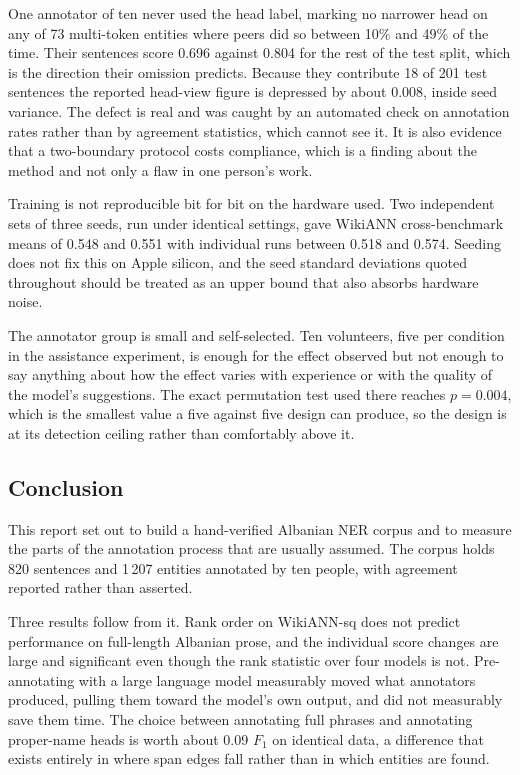 One annotator of ten never used the head label, marking no narrower head on any of 73 multi-token entities where peers did so between 10\% and 49\% of the time. Their sentences score 0.696 against 0.804 for the rest of the test split, which is the direction their omission predicts. Because they contribute 18 of 201 test sentences the reported head-view figure is depressed by about 0.008, inside seed variance. The defect is real and was caught by an automated check on annotation rates rather than by agreement statistics, which cannot see it. It is also evidence that a two-boundary protocol costs compliance, which is a finding about the method and not only a flaw in one person's work.

Training is not reproducible bit for bit on the hardware used. Two independent sets of three seeds, run under identical settings, gave WikiANN cross-benchmark means of 0.548 and 0.551 with individual runs between 0.518 and 0.574. Seeding does not fix this on Apple silicon, and the seed standard deviations quoted throughout should be treated as an upper bound that also absorbs hardware noise.

The annotator group is small and self-selected. Ten volunteers, five per condition in the assistance experiment, is enough for the effect observed but not enough to say anything about how the effect varies with experience or with the quality of the model's suggestions. The exact permutation test used there reaches $p = 0.004$, which is the smallest value a five against five design can produce, so the design is at its detection ceiling rather than comfortably above it.

\subsection{Conclusion}

This report set out to build a hand-verified Albanian NER corpus and to measure the parts of the annotation process that are usually assumed. The corpus holds 820 sentences and 1\,207 entities annotated by ten people, with agreement reported rather than asserted.

Three results follow from it. Rank order on WikiANN-sq does not predict performance on full-length Albanian prose, and the individual score changes are large and significant even though the rank statistic over four models is not. Pre-annotating with a large language model measurably moved what annotators produced, pulling them toward the model's own output, and did not measurably save them time. The choice between annotating full phrases and annotating proper-name heads is worth about 0.09 $F_1$ on identical data, a difference that exists entirely in where span edges fall rather than in which entities are found.

